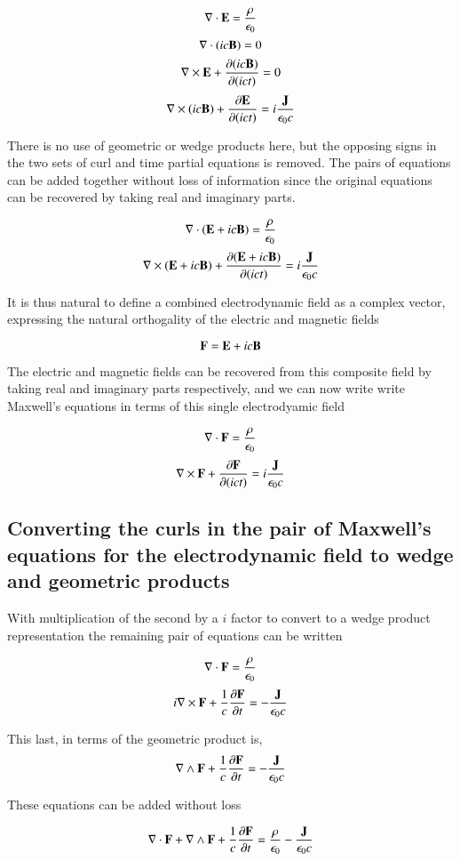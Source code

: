 \documentclass{article}      %
\begin{document}
\[
\nabla \cdot \mathbf{E}  = \frac {\rho} {\epsilon_0}
\]
\[
\nabla \cdot (ic\mathbf{B} ) = 0
\]
\[
\nabla \times \mathbf{E}  +\frac{\partial (ic\mathbf{B} )} {\partial (ict)} = 0
\]
\[
\nabla \times (ic\mathbf{B} ) + \frac{\partial \mathbf{E} } {\partial (ict)}
= i\frac{\mathbf{J}}{\epsilon_0 c}
\]

There is no use of geometric or wedge products here, but the opposing signs in the two sets of curl and time partial equations is removed.  The pairs of equations can be added together without loss of information since the original equations can be recovered by taking real and imaginary parts.

\[
\nabla \cdot (\mathbf{E} + ic \mathbf{B}) = \frac {\rho} {\epsilon_0}
\]
\[
\nabla \times (\mathbf{E} + ic \mathbf{B}) + \frac{\partial (\mathbf{E} + ic \mathbf{B})} {\partial (ict)}
= i\frac{\mathbf{J}}{\epsilon_0 c}
\]

It is thus natural to define a combined electrodynamic field as a complex vector, expressing the natural orthogality of the electric and magnetic fields

\[
\mathbf{F} = \mathbf{E} + ic \mathbf{B}
\]

The electric and magnetic fields can be recovered from this composite field by taking real and imaginary parts respectively, and we can now write write Maxwell's equations in terms of this single electrodyamic field

\[
\nabla \cdot \mathbf{F} = \frac {\rho} {\epsilon_0}
\]
\[
\nabla \times \mathbf{F} + \frac{\partial \mathbf{F}} {\partial (ict)}
= i\frac{\mathbf{J}}{\epsilon_0 c}
\]

\subsection{Converting the curls in the pair of Maxwell's equations for the electrodynamic field to wedge and geometric products }

With multiplication of the second by a $i$ factor to convert to a wedge product representation the remaining pair of equations can be written

\[
\nabla \cdot \mathbf{F} = \frac {\rho} {\epsilon_0}
\]
\[
i\nabla \times \mathbf{F} + \frac{1}{c} \frac{\partial \mathbf{F}}{\partial t} 
= -\frac{\mathbf{J}}{\epsilon_0 c}  
\]

This last, in terms of the geometric product is,
\[
\nabla \wedge \mathbf{F} + \frac{1}{c} \frac{\partial \mathbf{F}}{\partial t} 
= -\frac{\mathbf{J}}{\epsilon_0 c}  
\]

These equations can be added without loss

\[
\nabla \cdot \mathbf{F} + \nabla \wedge \mathbf{F} + \frac{1}{c} \frac{\partial \mathbf{F}}{\partial t} = \frac {\rho} {\epsilon_0} - \frac{\mathbf{J}}{\epsilon_0 c}
\]
\end{document}
